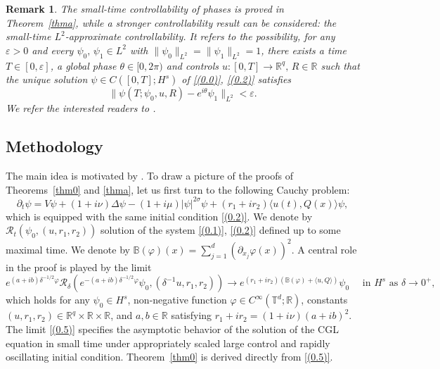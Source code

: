 \documentclass[review]{elsarticle}
\newtheorem{remark}{Remark}[section]
\theoremstyle{dotless}
\def\R {\mathbb{R}}
\numberwithin{equation}{section}
\begin{document}
\begin{remark}
	 The small-time controllability of phases is proved in Theorem~\ref{thma}, while a stronger controllability result can be considered: the small-time $L^2$-approximate controllability. It refers to the possibility, for any $\varepsilon>0$ and every $\psi_0,\, \psi_1\in L^2$ with $\|\psi_0\|_{L^2}=\|\psi_1\|_{L^2}=1$, there exists a time $T\in[0,\varepsilon]$, a global phase $\theta\in[0,2\pi)$ and controls $u: [0, T] \rightarrow \mathbb{R}^{q},\,R\in\R$ such that the unique solution $\psi \in C\left([0, T] ; H^s\right)$ of \eqref{(0.0)}, \eqref{(0.2)} satisfies\begin{equation*}
		\|	\psi(T;\psi_0,u,R)-e^{i\theta}\psi_1\|_{L^2}<\varepsilon.
	\end{equation*}
	We refer the interested readers to \cite{KB_EP_2}.
\end{remark}

\subsection{Methodology}
The main idea is motivated by \cite{Duca_EMS}. To draw a picture of the proofs of Theorems~\ref{thm0} and \ref{thma}, let us first turn to the following Cauchy problem: 
\begin{equation}\label{(0.1)}
	\partial_t \psi=V \psi+(1+i \nu) \Delta \psi-(1+i \mu)|\psi|^{2 \sigma} \psi +(r_1+i r_2) \langle u(t), Q(x)\rangle \psi ,
\end{equation}
which is equipped with the same initial condition \eqref{(0.2)}.
We denote by $\mathcal{R}_t\left(\psi_0, (u,r_1,r_2)\right)$ solution of the system \eqref{(0.1)}, \eqref{(0.2)} defined up to some maximal time. We denote by $\mathbb{B}(\varphi)(x)=\sum_{j=1}^d\left(\partial_{x_j} \varphi(x)\right)^2$. 
A central role in the proof is played by the limit
\begin{equation}\label{(0.5)}
	e^{ (a+ib)\delta^{-1 / 2} \varphi} \mathcal{R}_\delta\left(e^{-(a+ib) \delta^{-1 / 2} \varphi} \psi_0, (\delta^{-1} u,r_1,r_2)\right) \rightarrow e^{(r_1+i r_2)\left( \mathbb{B}(\varphi)+\langle u, Q\rangle\right)} \psi_0  \quad \text { in } H^s \text { as } \delta \rightarrow 0^{+},
\end{equation}
which holds for any $\psi_0 \in H^s$, non-negative function $\varphi \in C^{\infty}\left(\mathbb{T}^d ; \mathbb{R}\right)$,  constants $(u,r_1,r_2) \in \mathbb{R}^q\times\R\times\R$, and $ a,b\in\R $ satisfying $ r_1+ir_2=(1+i\nu)(a+ib)^2. $ The limit \eqref{(0.5)} specifies the asymptotic behavior of the solution of the CGL equation in small time under appropriately scaled large control and rapidly oscillating initial condition. Theorem~\ref{thm0} is derived directly from \eqref{(0.5)}. 
\end{document}

